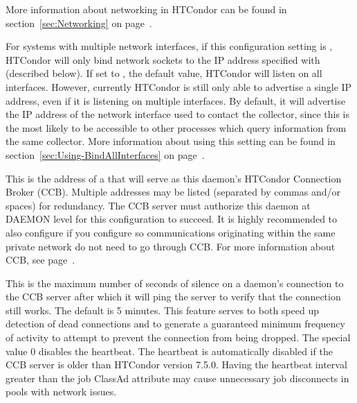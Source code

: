 More information about networking in HTCondor can be found in
section~\ref{sec:Networking} on page~\pageref{sec:Networking}.

\begin{description}

\label{param:BindAllInterfaces}
\item[\Macro{BIND\_ALL\_INTERFACES}]
  For systems with multiple network interfaces, if this configuration
  setting is , HTCondor will only bind network sockets to 
  the IP address specified with
   (described below).  If set to ,
  the default value, HTCondor will listen on all interfaces.
  However, currently HTCondor is still only able to advertise a single
  IP address, even if it is listening on multiple interfaces.  By
  default, it will advertise the IP address of the network interface
  used to contact the collector, since this is the most likely to be
  accessible to other processes which query information from the same
  collector.
  More information about using this setting can be found in
  section~\ref{sec:Using-BindAllInterfaces} on
  page~\pageref{sec:Using-BindAllInterfaces}. 

\label{param:CcbAddress}
\item[\Macro{CCB\_ADDRESS}] This is the address of a
   that will serve as this daemon's HTCondor
  Connection Broker (CCB).  Multiple addresses may be listed
  (separated by commas and/or spaces) for redundancy.  The CCB server
  must authorize this daemon at DAEMON level for this configuration to
  succeed.  It is highly recommended to also configure
   if you configure 
  so communications originating within the same private network do not
  need to go through CCB.  For more information about CCB,
  see page~\pageref{sec:CCB}.

\label{param:CcbHeartbeatInterval}
\item[\Macro{CCB\_HEARTBEAT\_INTERVAL}] This is the maximum
  number of seconds of silence on a daemon's connection to the CCB server
  after which it will ping the server to verify that the connection still
  works.  The default is 5 minutes.  This feature serves to both speed
  up detection of dead connections and to generate a guaranteed minimum
  frequency of activity to attempt to prevent the connection from being
  dropped.  The special value 0 disables the heartbeat.  The heartbeat
  is automatically disabled if the CCB server is older than 
  HTCondor version 7.5.0.  
  Having the heartbeat interval greater than the job ClassAd attribute
   may cause
  unnecessary job disconnects in pools with network issues.


\end{description}
